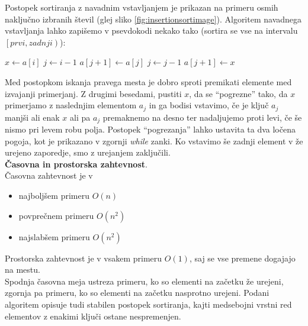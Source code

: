 \documentclass[a4paper,oneside]{article}
\begin{document}
Postopek sortiranja z navadnim vstavljanjem je prikazan na primeru osmih naključno
izbranih števil (glej sliko \ref{fig:insertionsortimage}). Algoritem navadnega
vstavljanja lahko zapišemo v psevdokodi nekako tako (sortira se vse na intervalu
$\left[prvi, zadnji\right)$):

\begin{algorithm}
  \caption{Urejanje z vstavljanjem}\label{algo:insertionsort}
  \begin{algorithmic}[1]
            \State $x \gets a[i]$
            \State $j \gets i - 1$
                \State $a[j+1] \gets a[j]$
                \State $j \gets j - 1$
            \EndWhile
            \State $a[j+1] \gets x$
        \EndFor
    \EndFunction
  \end{algorithmic}
\end{algorithm}

Med postopkom iskanja pravega mesta je dobro sproti premikati elemente med izvajanji
primerjanj. Z drugimi besedami, pustiti $x$, da se ``pogrezne'' tako, da $x$
primerjamo z naslednjim elementom $a_j$ in ga bodisi vstavimo, če je ključ $a_j$ manjši
ali enak $x$ ali pa $a_j$ premaknemo na desno ter nadaljujemo proti levi, če še nismo pri
levem robu polja. Postopek ``pogrezanja'' lahko ustavita ta dva ločena
pogoja, kot je prikazano v zgornji \emph{while} zanki.  Ko vstavimo še zadnji element v že 
urejeno zaporedje, smo z urejanjem zaključili.\\

\textbf{Časovna in prostorska zahtevnost}. \\
Časovna zahtevnost je v 
\begin{itemize}
  \item najboljšem primeru $O(n)$
  \item povprečnem primeru $O(n^2)$
  \item najslabšem primeru $O(n^2)$
\end{itemize}

Prostorska zahtevnost je v vsakem primeru $O(1)$, saj se vse premene dogajajo na
mestu.\\

Spodnja časovna meja ustreza primeru, ko so elementi na začetku že urejeni, zgornja pa primeru,
ko so elementi na začetku nasprotno urejeni. Podani algoritem opisuje tudi stabilen postopek sortiranja, kajti medsebojni
vrstni red elementov z enakimi ključi ostane nespremenjen.
\end{document}
